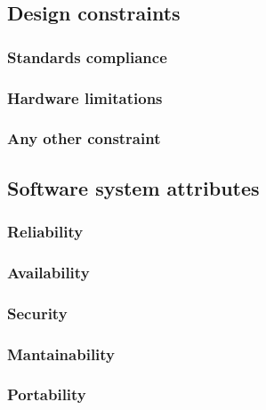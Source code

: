   \subsection{Design constraints}
    \subsubsection{Standards compliance}
    \subsubsection{Hardware limitations}
    \subsubsection{Any other constraint}
  \subsection{Software system attributes}
    \subsubsection{Reliability}
    \subsubsection{Availability}
    \subsubsection{Security}
    \subsubsection{Mantainability}
    \subsubsection{Portability}
